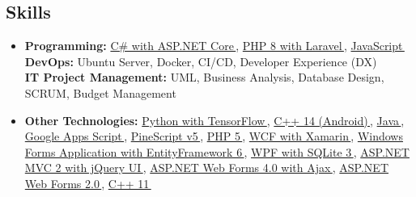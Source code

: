 \documentclass[11pt,a4paper]{article}
\let\orighref\href
\renewcommand{\href}[2]{\orighref{#1}{#2\,{\textsuperscript{\tiny{\faExternalLink}}}}}
\begin{document}
\begin{justify}
\section{Skills}
 \begin{itemize}[leftmargin=0.15in, label={}]
    \item {
        \textbf{Programming:}
        \href{https://github.com/tayyebi/TehranStocks}{C\# with ASP.NET Core},
        \href{https://github.com/tayyebi/rest-api-laravel-swagger-practice}{PHP 8 with Laravel},
        \href{https://github.com/tayyebi/textyy}{JavaScript}
        \\
        \textbf{DevOps:}
        {Ubuntu Server},
        {Docker},
        {CI/CD},
        {Developer Experience (DX)}
        \\
        \textbf{IT Project Management:}
        {UML},
        {Business Analysis},
        {Database Design},
        {SCRUM},
        {Budget Management}
    }
    \item{
         \textbf{Other Technologies:}\small{
         \href{https://github.com/tayyebi/NlpSemanticAnalysis}{Python with TensorFlow},
         \href{https://github.com/tayyebi/Baqemboogh}{C++ 14 (Android)},
         \href{https://github.com/tayyebi/Checkeh}{Java},         \href{https://gist.github.com/tayyebi/927aee5787ba45b3ab0fd637bedfd653}{Google Apps Script},
         \href{https://www.tradingview.com/u/tayyebi}{PineScript v5},
         \href{https://github.com/Gordarg/SF}{PHP 5},
         \href{https://github.com/tayyebi/Dr-Hesaabi-KhajeNasirAccountingSystem}{WCF with Xamarin},
         \href{https://github.com/tayyebi/TuneMax}{Windows Forms Application with EntityFramework 6},
         \href{https://github.com/tayyebi/humancapitals}{WPF with SQLite 3},
         \href{https://github.com/tayyebi/TuneMax}{ASP.NET MVC 2 with jQuery UI},
         \href{https://github.com/tayyebi/SnowCity}{ASP.NET Web Forms 4.0 with Ajax},
         \href{https://github.com/tayyebi/HQCMA}{ASP.NET Web Forms 2.0},
         \href{https://gist.github.com/tayyebi/da6a754e3af0553b897f9237248dafcc}{C++ 11}
         }
    }
     
 \end{itemize}


\end{justify}
\end{document}
